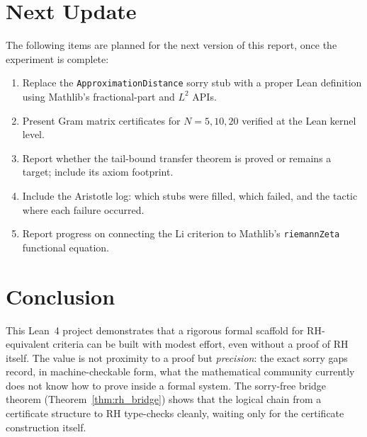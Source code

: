 \documentclass[11pt,a4paper]{article}
\begin{document}
\section{Next Update}

The following items are planned for the next version of this report, once the
experiment is complete:

\begin{enumerate}
  \item Replace the \texttt{ApproximationDistance} sorry stub with a proper
        Lean definition using Mathlib's fractional-part and $L^2$ APIs.
  \item Present Gram matrix certificates for $N = 5, 10, 20$ verified at the
        Lean kernel level.
  \item Report whether the tail-bound transfer theorem is proved or remains a
        target; include its axiom footprint.
  \item Include the Aristotle log: which stubs were filled, which failed, and
        the tactic where each failure occurred.
  \item Report progress on connecting the Li criterion to Mathlib's
        \texttt{riemannZeta} functional equation.
\end{enumerate}

\section{Conclusion}

This Lean~4 project demonstrates that a rigorous formal scaffold for
RH-equivalent criteria can be built with modest effort, even without a proof
of RH itself.  The value is not proximity to a proof but \emph{precision}: the
exact sorry gaps record, in machine-checkable form, what the mathematical
community currently does not know how to prove inside a formal system.  The
sorry-free bridge theorem (Theorem~\ref{thm:rh_bridge}) shows that the logical
chain from a certificate structure to RH type-checks cleanly, waiting only for
the certificate construction itself.
\end{document}
